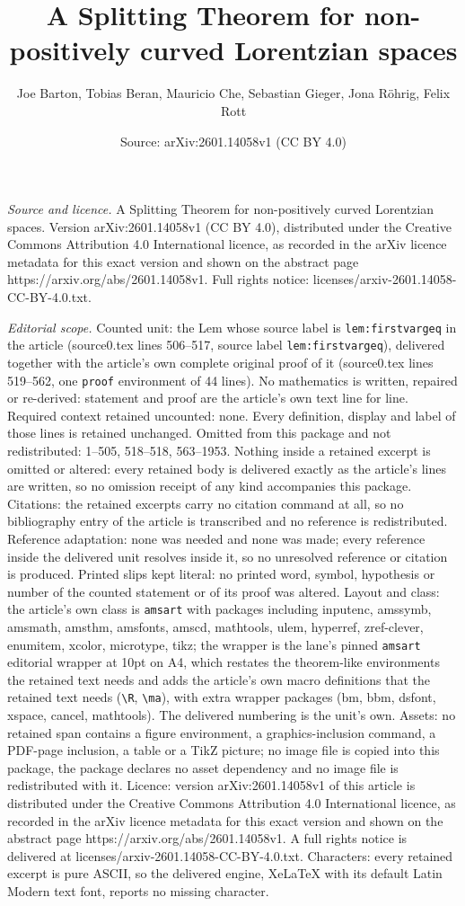 \documentclass[10pt,a4paper]{amsart}
\title[A Splitting Theorem for non-positively curved Lorentzian spa]{A Splitting Theorem for non-positively curved Lorentzian spaces}
\author{Joe Barton, Tobias Beran, Mauricio Che, Sebastian Gieger, Jona R\"ohrig, Felix Rott}
\date{Source: arXiv:2601.14058v1 (CC BY 4.0)}
\begin{document}
\maketitle

\noindent\emph{Source and licence.} A Splitting Theorem for non-positively curved Lorentzian spaces. Version arXiv:2601.14058v1 (CC BY 4.0), distributed under the Creative Commons Attribution 4.0 International licence, as recorded in the arXiv licence metadata for this exact version and shown on the abstract page https://arxiv.org/abs/2601.14058v1. Full rights notice: licenses/arxiv-2601.14058-CC-BY-4.0.txt.\par\smallskip

\noindent\textit{Editorial scope.} Counted unit: the Lem whose source label is \texttt{lem:firstvargeq} in the article (source0.tex lines 506--517, source label \texttt{lem:firstvargeq}), delivered together with the article's own complete original proof of it (source0.tex lines 519--562, one \texttt{proof} environment of 44 lines). No mathematics is written, repaired or re-derived: statement and proof are the article's own text line for line. Required context retained uncounted: none. Every definition, display and label of those lines is retained unchanged. Omitted from this package and not redistributed: 1--505, 518--518, 563--1953. Nothing inside a retained excerpt is omitted or altered: every retained body is delivered exactly as the article's lines are written, so no omission receipt of any kind accompanies this package. Citations: the retained excerpts carry no citation command at all, so no bibliography entry of the article is transcribed and no reference is redistributed. Reference adaptation: none was needed and none was made; every reference inside the delivered unit resolves inside it, so no unresolved reference or citation is produced. Printed slips kept literal: no printed word, symbol, hypothesis or number of the counted statement or of its proof was altered. Layout and class: the article's own class is \texttt{amsart} with packages including inputenc, amssymb, amsmath, amsthm, amsfonts, amscd, mathtools, ulem, hyperref, zref-clever, enumitem, xcolor, microtype, tikz; the wrapper is the lane's pinned \texttt{amsart} editorial wrapper at 10pt on A4, which restates the theorem-like environments the retained text needs and adds the article's own macro definitions that the retained text needs (\texttt{\textbackslash R}, \texttt{\textbackslash ma}), with extra wrapper packages (bm, bbm, dsfont, xspace, cancel, mathtools). The delivered numbering is the unit's own. Assets: no retained span contains a figure environment, a graphics-inclusion command, a PDF-page inclusion, a table or a TikZ picture; no image file is copied into this package, the package declares no asset dependency and no image file is redistributed with it. Licence: version arXiv:2601.14058v1 of this article is distributed under the Creative Commons Attribution 4.0 International licence, as recorded in the arXiv licence metadata for this exact version and shown on the abstract page https://arxiv.org/abs/2601.14058v1. A full rights notice is delivered at licenses/arxiv-2601.14058-CC-BY-4.0.txt. Characters: every retained excerpt is pure ASCII, so the delivered engine, XeLaTeX with its default Latin Modern text font, reports no missing character.
\end{document}
